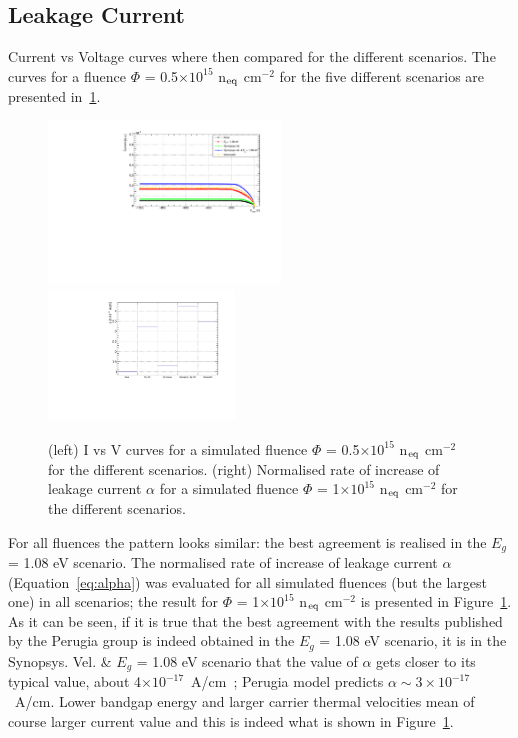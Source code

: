 \subsection{Leakage Current}

Current vs Voltage curves where then compared for the different scenarios. The curves for a fluence 
$\Phi$ =  0.5$\times10^{15}$ n$_{\rm eq}$ cm$^{-2}$ for the five different scenarios are presented
 in~\ref{fig:read_and_draw_alpha_Perugia2015_fl1e15}.
\begin{figure}[!htpb]
\centering
\includegraphics[width=0.55\textwidth]{IV_no_mult_Perugia_fl5e14.pdf}
\includegraphics[width=0.44\textwidth]{read_and_draw_alpha_Perugia2015_fl1e15.pdf}
\caption{\label{fig:read_and_draw_alpha_Perugia2015_fl1e15} (left) I vs V curves for a simulated fluence $\Phi$ =  0.5$\times10^{15}$ n$_{\rm eq}$ cm$^{-2}$ for the  different scenarios. (right) Normalised rate of increase of leakage current $\alpha$  for a simulated fluence $\Phi$ =  1$\times10^{15}$ n$_{\rm eq}$ cm$^{-2}$  for the  different scenarios.}
\end{figure}

For all fluences the pattern looks similar: the best agreement is realised in the $E_g$ = 1.08 eV scenario. 
The normalised rate of increase of leakage current $\alpha$ (Equation~\ref{eq:alpha})  was evaluated 
for all simulated fluences (but the largest one) in all scenarios; the result for 
$\Phi$ =  1$\times10^{15}$ n$_{\rm eq}$ cm$^{-2}$  is presented in 
Figure~\ref{fig:read_and_draw_alpha_Perugia2015_fl1e15}. As it can be seen, if it is true that the best 
agreement with the results published by the Perugia group is indeed obtained in the $E_g$ = 1.08 eV 
scenario, it is in the Synopsys. Vel. \& $E_g$ = 1.08 eV scenario that the value of $\alpha$ 
gets closer to its typical value, about 4$\times10^{-17}$~A/cm~\cite{moll-thesis}; Perugia model 
predicts $\alpha\sim3\times10^{-17}$~A/cm.
Lower bandgap energy and larger carrier thermal velocities mean of course larger current value and this 
is indeed  what  is shown in Figure~\ref{fig:read_and_draw_alpha_Perugia2015_fl1e15}.

